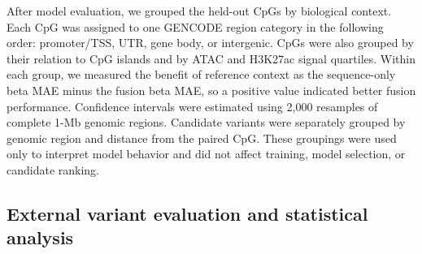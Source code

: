 \documentclass[10pt,letterpaper,twocolumn]{article}
\begin{document}
{\color{addedred}
After model evaluation, we grouped the held-out CpGs by biological context. Each
CpG was assigned to one GENCODE region category in the following order:
promoter/TSS, UTR, gene body, or intergenic. CpGs were also grouped by their
relation to CpG islands and by ATAC and H3K27ac signal quartiles. Within each
group, we measured the benefit of reference context as the sequence-only beta
MAE minus the fusion beta MAE, so a positive value indicated better fusion
performance. Confidence intervals were estimated using 2,000 resamples of
complete 1-Mb genomic regions. Candidate variants were separately grouped by
genomic region and distance from the paired CpG. These groupings were used only
to interpret model behavior and did not affect training, model selection, or
candidate ranking.
}

\subsection{External variant evaluation and statistical analysis}
\label{sec:genoa-methods}
\end{document}
